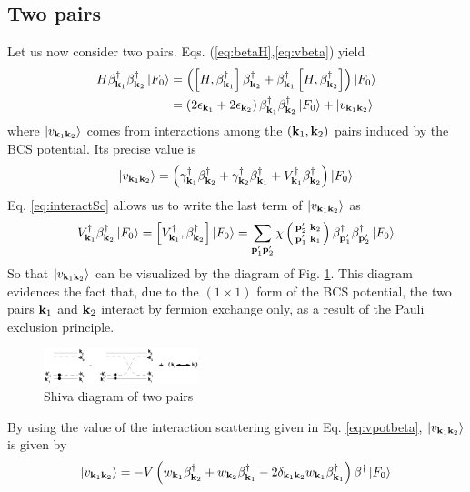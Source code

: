 \documentclass[aps,prb,amsmath,amssymb,preprint,superscriptaddress]{revtex4-1}
\newcommand{\fo}{\ensuremath{\ket{F_0}}}
\begin{document}
\subsection{Two pairs}
Let us now consider two pairs.  Eqs. (\ref{eq:betaH},\ref{eq:vbeta})  yield 
\begin{equation}\label{eq:SchTwo}
\begin{split}
H\beta^{\dagger}_{\vk_1}\beta^{\dagger}_{\vk_2}\fo
&=\br{\com{H}{\beta^{\dagger}_{\vk_1}}\beta^{\dagger}_{\vk_2}+\beta^{\dagger}_{\vk_1}\com{H}{\beta^{\dagger}_{\vk_2}}}\fo\\
&=\br{2\epsilon_{\vk_1}+2\epsilon_{\vk_2}}\beta^{\dagger}_{\vk_1}\beta^{\dagger}_{\vk_2}\fo+\ket{v_{\vk_1\vk_2}}
\end{split}
\end{equation}
where $\left|v_{\mathbf{k}_1\mathbf{k}_2}\right>$ comes from interactions among the $\left(\mathbf{k}_1,\mathbf{k}_2\right)$ pairs induced by the BCS potential.  Its precise value is 
\begin{equation}
\ket{v_{\vk_1\vk_2}}=\br{\gamma^{\dagger}_{\vk_1}\beta^{\dagger}_{\vk_2}+\gamma^{\dagger}_{\vk_2}\beta^{\dagger}_{\vk_1}+V^{\dagger}_{\vk_1}\beta^{\dagger}_{\vk_2}}\fo
\end{equation}
Eq. \eqref{eq:interactSc} allows us to write the last term of $\left|v_{\mathbf{k}_1\mathbf{k}_2}\right>$ as 
\begin{equation}
V^{\dagger}_{\vk_1}\beta^{\dagger}_{\vk_2}\fo=\com{V^{\dagger}_{\vk_1}}{\beta^{\dagger}_{\vk_2}}\fo=
\sum_{\vp'_1\vp'_2}\chi\fmtrx{\vp'_2}{\vk_2}{\vp'_1}{\vk_1}\beta^{\dagger}_{\vp'_1}\beta^{\dagger}_{\vp'_2}\fo
\end{equation}
So that  $\left|v_{\mathbf{k}_1\mathbf{k}_2}\right>$ can be visualized by the diagram of Fig. \ref{fig:twoP}. This diagram evidences the fact that, due to the $(1\times1)$ form of the BCS potential, the two pairs $\mathbf{k}_1$ and $\mathbf{k}_2$ interact by fermion exchange only, as a result of the Pauli exclusion principle. 

\begin{figure}[htb]
  \includegraphics[width=0.4\textwidth]{cobosonCooper/twoPair.eps}
 \caption{Shiva diagram of two pairs \label{fig:twoP}}
\end{figure}

By using the value of the interaction scattering given in Eq. \eqref{eq:vpotbeta},   $\left|v_{\mathbf{k}_1\mathbf{k}_2}\right>$ is given by
\begin{equation}
\ket{v_{\vk_1\vk_2}}=-V\br{w_{\vk_1}\beta^{\dagger}_{\vk_2}+w_{\vk_2}\beta^{\dagger}_{\vk_1}-2\delta_{\vk_1\vk_2}w_{\vk_1}\beta^{\dagger}_{\vk_1}}\beta^{\dagger}\fo
\end{equation}
\end{document}

